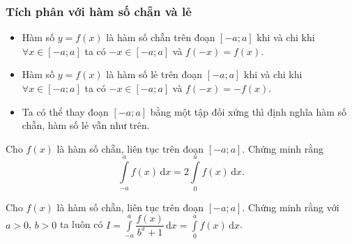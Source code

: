 \subsubsection{Tích phân với hàm số chẵn và lẻ}
\begin{itemize}
	\item Hàm số $y=f(x)$ là hàm số chẵn trên đoạn $[-a;a]$ khi và chi khi $\forall x\in[-a;a]$ ta có $-x\in[-a;a]$ và $f(-x)=f(x)$.
	\item Hàm số $y=f(x)$ là hàm số lẻ trên đoạn $[-a;a]$ khi và chi khi $\forall x\in[-a;a]$ ta có $-x\in[-a;a]$ và $f(-x)=-f(x)$.
	\item Ta có thể thay đoạn $[-a;a]$ bằng một tập đối xứng thì định nghĩa hàm số chẵn, hàm số lẻ vẫn như trên.
\end{itemize}
\begin{ex}%
	Cho $f(x)$ là hàm số chẵn, liên tục trên đoạn $[-a;a]$. Chứng minh rằng \[\displaystyle\int\limits_{-a}^a f(x)\mathrm{\,d}x=2\displaystyle\int\limits_0^a f(x)\mathrm{\,d}x.\]
\end{ex}
\begin{ex}%
	Cho $f(x)$ là hàm số chẵn, liên tục trên đoạn $[-a;a]$. Chứng minh rằng với $a>0$, $b>0$ ta luôn có
	$I=\displaystyle\int\limits_{-a}^a\dfrac{f(x)}{b^x+1}\mathrm{\,d}x=\displaystyle\int\limits_0^a f(x)\mathrm{\,d}x$.
\end{ex}
